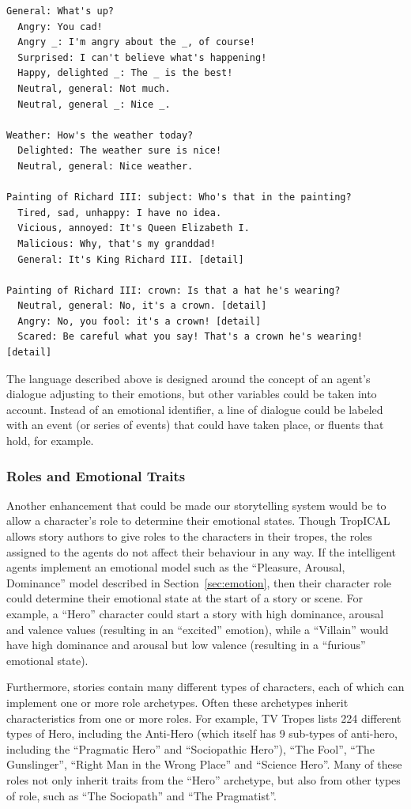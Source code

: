 \documentclass[11pt]{report}
\begin{document}
\begin{lstlisting}[showstringspaces=false]
General: What's up?
  Angry: You cad!
  Angry _: I'm angry about the _, of course!
  Surprised: I can't believe what's happening!
  Happy, delighted _: The _ is the best!
  Neutral, general: Not much.
  Neutral, general _: Nice _.

Weather: How's the weather today?
  Delighted: The weather sure is nice!
  Neutral, general: Nice weather.

Painting of Richard III: subject: Who's that in the painting?
  Tired, sad, unhappy: I have no idea.
  Vicious, annoyed: It's Queen Elizabeth I.
  Malicious: Why, that's my granddad!
  General: It's King Richard III. [detail]

Painting of Richard III: crown: Is that a hat he's wearing?
  Neutral, general: No, it's a crown. [detail]
  Angry: No, you fool: it's a crown! [detail]
  Scared: Be careful what you say! That's a crown he's wearing! [detail]
\end{lstlisting}

The language described above is designed around the concept of an agent's
dialogue adjusting to their emotions, but other variables could be taken into
account. Instead of an emotional identifier, a line of dialogue could be labeled
with an event (or series of events) that could have taken place, or fluents that
hold, for example.

\subsubsection{Roles and Emotional Traits}
\label{sec:role-emotions}
Another enhancement that could be made our storytelling system would be to allow
a character's role to determine their emotional states.
Though TropICAL allows story authors to give roles to the characters in their
tropes, the roles assigned to the agents do not affect their behaviour in any
way. If the intelligent agents implement an emotional model such as the
``Pleasure, Arousal, Dominance''
model described in Section~\ref{sec:emotion}, then their character role could
determine their emotional state at the start of a story or scene. For example, a
``Hero'' character could start a story with high dominance, arousal and valence
values (resulting in an ``excited'' emotion), while a ``Villain'' would have
high dominance and arousal but low valence (resulting in a ``furious'' emotional
state).

Furthermore, stories contain many different types of characters, each of which can implement
one or more role archetypes. Often these archetypes inherit characteristics from
one or more roles. For example, TV Tropes lists 224 different types of Hero,
including the Anti-Hero (which itself has 9 sub-types of anti-hero, including
the ``Pragmatic Hero'' and ``Sociopathic Hero''), ``The Fool'', ``The
Gunslinger'', ``Right Man in the Wrong Place'' and ``Science Hero''. Many of
these roles not only inherit traits from the ``Hero'' archetype, but also from
other types of role, such as ``The Sociopath'' and ``The Pragmatist''.
\end{document}
